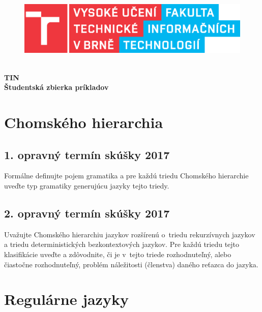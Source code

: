\documentclass[11pt,a4paper]{article}
\begin{document}
	\begin{titlepage}
		\begin{center}
			\hfill\\[20em]
			\begin{figure}[H]
				\centering
				\includegraphics[scale=0.8]{logo.eps}
			\end{figure}
			\hfill\\[1em]
			\Huge{
				\textbf{
					TIN
				}
			}
			\hfill\\[1em]
			\huge{
				\textbf{
					Študentská zbierka príkladov
				}
			}
		\end{center}
	\end{titlepage}
	\newpage

	\tableofcontents
	\newpage

	\section{Chomského hierarchia}

		\subsection{1. opravný termín skúšky 2017}

		Formálne definujte pojem gramatika a pre každú triedu Chomského hierarchie uveďte typ gramatiky generujúcu jazyky tejto triedy.

		\subsection{2. opravný termín skúšky 2017}

		Uvažujte Chomského hierarchiu jazykov rozšírenú o~triedu rekurzívnych jazykov a triedu deterministických bezkontextových jazykov. Pre každú triedu tejto klasifikácie uveďte a zdôvodnite, či je v~tejto triede rozhodnuteľný, alebo čiastočne rozhodnuteľný, problém náležitosti (členstva) daného reťazca do jazyka.

	\section{Regulárne jazyky}
\end{document}
